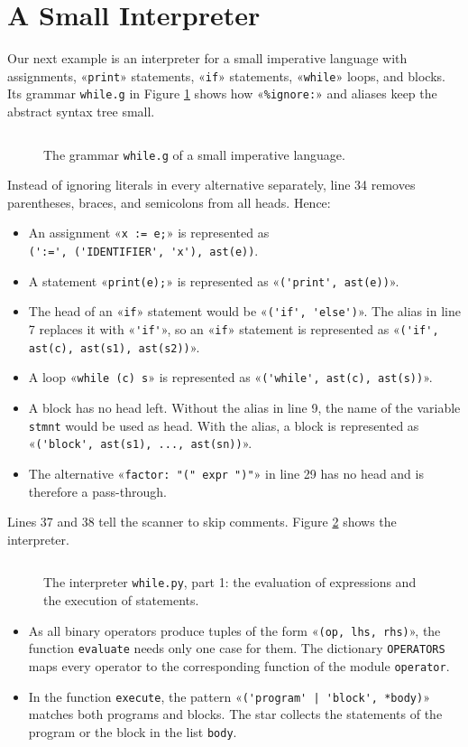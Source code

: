 \documentclass[11pt,a4paper]{article}
\newcommand{\codefigure}[5][]{\begin{figure}[H]%
  \inputminted[numbers = left, numbersep = 0.3cm, #1]{#2}{examples/#3}%
  \vspace*{-0.3cm}%
  \caption{#5}\label{#4}\end{figure}}
\newcommand{\grammarfile}[2]{\codefigure{larkita_lexer.py:LarkitaLexer}{#1}{fig:#1}{#2}}
\begin{document}
\section{A Small Interpreter}
\label{sec:interpreter}
Our next example is an interpreter for a small imperative language with assignments, «\verb|print|»
statements, «\verb|if|» statements, «\verb|while|» loops, and blocks.  Its grammar \texttt{while.g} in Figure
\ref{fig:while.g} shows how «\verb|%ignore:|» and aliases keep the abstract syntax tree small.
\grammarfile{while.g}{The grammar \texttt{while.g} of a small imperative language.}
Instead of ignoring literals in every alternative separately, line 34 removes parentheses, braces, and
semicolons from all heads.  Hence:
\begin{itemize}
\item An assignment «\verb|x := e;|» is represented as
      \\[0.2cm]
      \hspace*{1.3cm}
      \verb|(':=', ('IDENTIFIER', 'x'), ast(e))|.
\item A statement «\verb|print(e);|» is represented as «\verb|('print', ast(e))|».
\item The head of an «\verb|if|» statement would be «\verb|('if', 'else')|».  The alias in line 7 replaces it with
      «\verb|'if'|», so an «\verb|if|» statement is represented as «\verb|('if', ast(c), ast(s1), ast(s2))|».
\item A loop «\verb|while (c) s|» is represented as «\verb|('while', ast(c), ast(s))|».
\item A block has no head left.  Without the alias in line 9, the name of the variable \texttt{stmnt} would be used as
      head.  With the alias, a block is represented as «\verb|('block', ast(s1), ..., ast(sn))|».
\item The alternative «\verb|factor: "(" expr ")"|» in line 29 has no head and is therefore a pass-through.
\end{itemize}
Lines 37 and 38 tell the scanner to skip comments.  Figure \ref{fig:while.py:interpreter} shows the
interpreter.
\codefigure[lastline = 40]{python3}{while.py}{fig:while.py:interpreter}{The interpreter \texttt{while.py},
  part 1: the evaluation of expressions and the execution of statements.}
\begin{itemize}
\item As all binary operators produce tuples of the form «\verb|(op, lhs, rhs)|», the function
      \texttt{evaluate} needs only one case for them.  The dictionary \texttt{OPERATORS} maps every operator to
      the corresponding function of the module \texttt{operator}.
\item In the function \texttt{execute}, the pattern «\verb+('program' | 'block', *body)+» matches both programs
      and blocks.  The star collects the statements of the program or the block in the list \texttt{body}.
\end{itemize}
\end{document}
